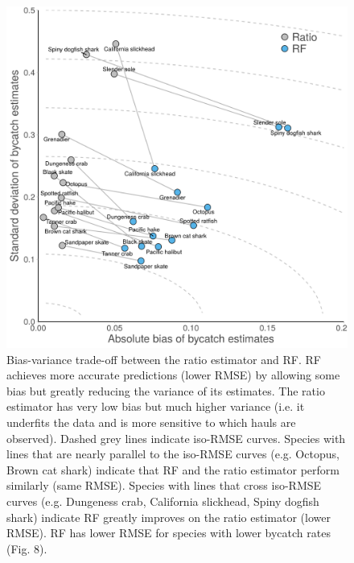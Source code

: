 \documentclass[]{article}
\begin{document}
\begin{figure}

{\centering \includegraphics[width=6in]{../../figures/supplement/fig7_tradeoffs_v2} 

}

\caption{Bias-variance trade-off between the ratio estimator and RF. RF achieves more accurate predictions (lower RMSE) by allowing some bias but greatly reducing the variance of its estimates. The ratio estimator has very low bias but much higher variance (i.e. it underfits the data and is more sensitive to which hauls are observed). Dashed grey lines indicate iso-RMSE curves. Species with lines that are nearly parallel to the iso-RMSE curves (e.g. Octopus, Brown cat shark) indicate that RF and the ratio estimator perform similarly (same RMSE). Species with lines that cross iso-RMSE curves (e.g. Dungeness crab, California slickhead, Spiny dogfish shark) indicate RF greatly improves on the ratio estimator (lower RMSE). RF has lower RMSE for species with lower bycatch rates (Fig. 8).}\label{fig:variance-bias}
\end{figure}
\end{document}
